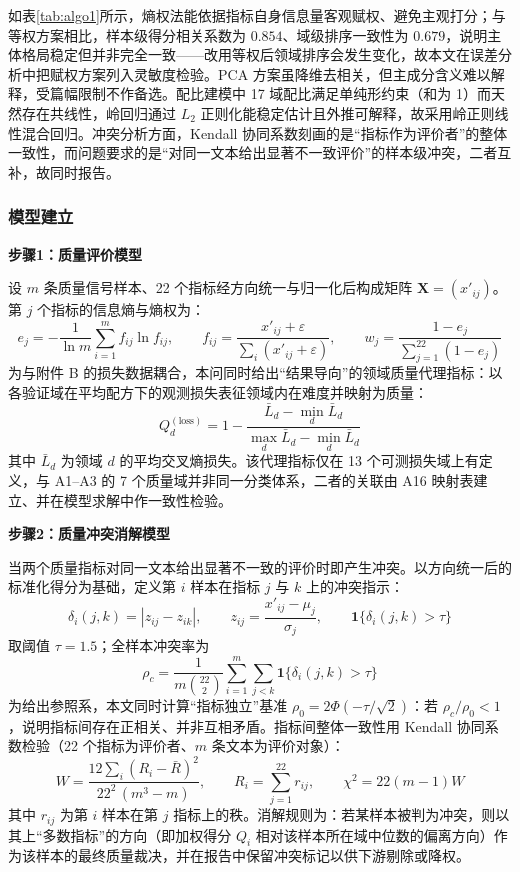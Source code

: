 如表\ref{tab:algo1}所示，熵权法能依据指标自身信息量客观赋权、避免主观打分；与等权方案相比，样本级得分相关系数为 $0.854$、域级排序一致性为 $0.679$，说明主体格局稳定但并非完全一致——改用等权后领域排序会发生变化，故本文在误差分析中把赋权方案列入灵敏度检验。PCA 方案虽降维去相关，但主成分含义难以解释，受篇幅限制不作备选。配比建模中 17 域配比满足单纯形约束（和为 1）而天然存在共线性，岭回归通过 $L_2$ 正则化能稳定估计且外推可解释，故采用岭正则线性混合回归。冲突分析方面，Kendall 协同系数刻画的是“指标作为评价者”的整体一致性，而问题要求的是“对同一文本给出显著不一致评价”的样本级冲突，二者互补，故同时报告。

\subsubsection{模型建立}

\textbf{步骤1：质量评价模型}

设 $m$ 条质量信号样本、22 个指标经方向统一与归一化后构成矩阵 $\bm X=(x'_{ij})$。第 $j$ 个指标的信息熵与熵权为：
\begin{equation}
    e_j = -\frac{1}{\ln m}\sum_{i=1}^{m} f_{ij}\ln f_{ij},\qquad f_{ij}=\frac{x'_{ij}+\varepsilon}{\sum_i (x'_{ij}+\varepsilon)},\qquad
    w_j = \frac{1-e_j}{\sum_{j=1}^{22}(1-e_j)}
\end{equation}
为与附件 B 的损失数据耦合，本问同时给出“结果导向”的领域质量代理指标：以各验证域在平均配方下的观测损失表征领域内在难度并映射为质量：
\begin{equation}
    Q_d^{(\text{loss})}=1-\frac{\bar L_d-\min_d \bar L_d}{\max_d \bar L_d-\min_d \bar L_d}
\end{equation}
其中 $\bar L_d$ 为领域 $d$ 的平均交叉熵损失。该代理指标仅在 13 个可测损失域上有定义，与 A1--A3 的 7 个质量域并非同一分类体系，二者的关联由 A16 映射表建立、并在模型求解中作一致性检验。

\textbf{步骤2：质量冲突消解模型}

当两个质量指标对同一文本给出显著不一致的评价时即产生冲突。以方向统一后的标准化得分为基础，定义第 $i$ 样本在指标 $j$ 与 $k$ 上的冲突指示：
\begin{equation}
    \delta_i(j,k) = \left| z_{ij} - z_{ik} \right|,\qquad z_{ij}=\frac{x'_{ij}-\mu_j}{\sigma_j},\qquad
    \mathbf 1\{\delta_i(j,k)>\tau\}
\end{equation}
取阈值 $\tau=1.5$；全样本冲突率为
\begin{equation}
    \rho_c = \frac{1}{m\binom{22}{2}}\sum_{i=1}^{m}\sum_{j<k}\mathbf 1\{\delta_i(j,k)>\tau\}
\end{equation}
为给出参照系，本文同时计算“指标独立”基准 $\rho_0=2\Phi(-\tau/\sqrt2)$：若 $\rho_c/\rho_0<1$，说明指标间存在正相关、并非互相矛盾。指标间整体一致性用 Kendall 协同系数检验（22 个指标为评价者、$m$ 条文本为评价对象）：
\begin{equation}
    W = \frac{12\sum_i (R_i-\bar R)^2}{22^2\,(m^3-m)},\qquad R_i=\sum_{j=1}^{22} r_{ij},\qquad
    \chi^2 = 22(m-1)W
\end{equation}
其中 $r_{ij}$ 为第 $i$ 样本在第 $j$ 指标上的秩。消解规则为：若某样本被判为冲突，则以其上“多数指标”的方向（即加权得分 $Q_i$ 相对该样本所在域中位数的偏离方向）作为该样本的最终质量裁决，并在报告中保留冲突标记以供下游剔除或降权。

